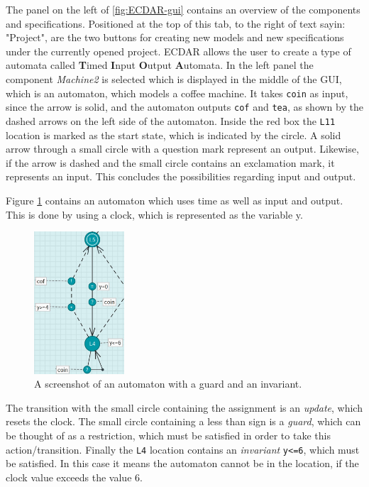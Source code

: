 The panel on the left of \autoref{fig:ECDAR-gui} contains an overview of the components and specifications. 
Positioned at the top of this tab, to the right of text sayin: "Project", are the two buttons for creating new models and new specifications under the currently opened project.
ECDAR allows the user to create a type of automata called \textbf{T}imed \textbf{I}nput \textbf{O}utput \textbf{A}utomata. 
In the left panel the component \textit{Machine2} is selected which is displayed in the middle of the GUI, which is an automaton, which models a coffee machine.
It takes \texttt{coin} as input, since the arrow is solid, and the automaton outputs \texttt{cof} and \texttt{tea}, as shown by the dashed arrows on the left side of the automaton.
Inside the red box the \texttt{L11} location is marked as the start state, which is indicated by the circle.
A solid arrow through a small circle with a question mark represent an output. 
Likewise, if the arrow is dashed and the small circle contains an exclamation mark, it represents an input.
This concludes the possibilities regarding input and output.

Figure \ref{fig:ECDAR-guard} contains an automaton which uses time as well as input and output.
This is done by using a clock, which is represented as the variable y.
\begin{figure}[H]
    \centering
    \includegraphics[width=0.3\textwidth]{common/figures/ecdar-guards.jpg}
    \caption{A screenshot of an automaton with a guard and an invariant.}
    \label{fig:ECDAR-guard}
\end{figure}

The transition with the small circle containing the assignment is an \textit{update}, which resets the clock.
The small circle containing a less than sign is a \textit{guard}, which can be thought of as a restriction, which must be satisfied in order to take this action/transition.
Finally the \texttt{L4} location contains an \textit{invariant} \texttt{y<=6}, which must be satisfied. 
In this case it means the automaton cannot be in the location, if the clock value exceeds the value 6.

